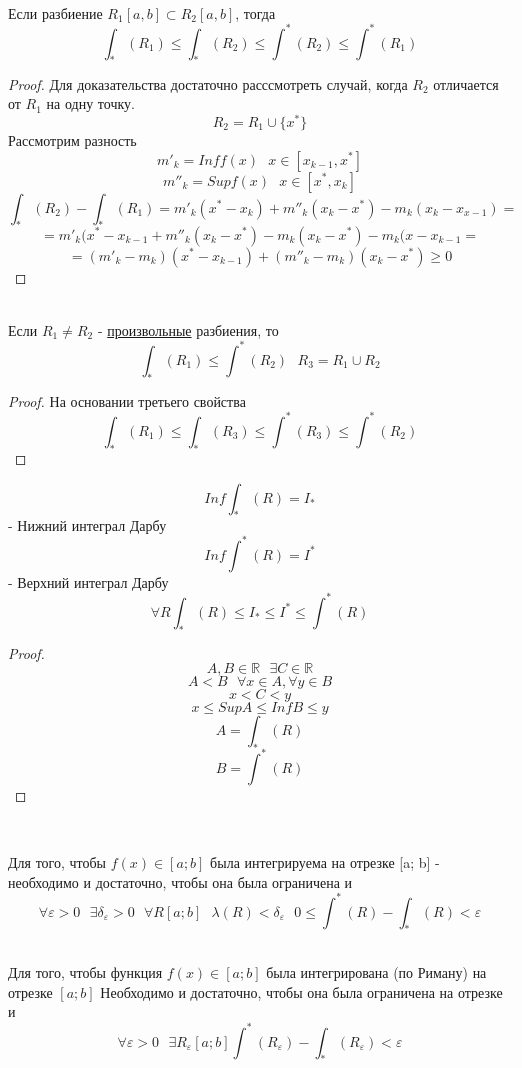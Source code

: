 \\
Если разбиение $R_1 [a,b] \subset R_2 [a,b]$, тогда
\[\int_* (R_1) \le \int_* (R_2) \le \int^* (R_2) \le \int^* (R_1)\]

\begin{proof}
  Для доказательства достаточно расссмотреть случай, когда $R_2$ отличается от
  $R_1$ на одну точку.
  \[R_2 = R_1 \cup \{x^*\}\]
  Рассмотрим разность
  \[m'_k = Inf f(x) ~~~ x \in [x_{k - 1}, x^*]\]
  \[m''_k = Sup f(x) ~~~ x \in [x^*, x_k]\]
  \[\int_* (R_2) - \int_* (R_1) = m'_k (x^* - x_k) + m''_k (x_k - x^*) -
    m_k (x_k - x_{x - 1}) = \]
  \[= m'_k (x^* - x_{k - 1} + m''_k (x_k - x^*) - m_k (x_k - x^*) -
    m_k (x - x_{k - 1} =\]
  \[= (m'_k - m_k)(x^* - x_{k - 1}) + (m''_k - m_k)
    (x_k - x^*) \ge 0\]
\end{proof}

\\
Если $R_1 \ne R_2$ - \underline{произвольные} разбиения, то
\[\int_* (R_1) \le \int^* (R_2) ~~~ R_3 = R_1 \cup R_2\]

\begin{proof}
  На основании третьего свойства
  \[\int_* (R_1) \le \int_* (R_3) \le \int^* (R_3) \le \int^* (R_2)\]
\end{proof}

\[Inf \int_* (R) = I_*\] - Нижний интеграл Дарбу
\[Inf \int^* (R) = I^*\] - Верхний интеграл Дарбу
\[\forall R \int_* (R) \le I_* \le I^* \le \int^* (R)\]

\begin{proof}
  \[A, B \in \mathbb R ~~~ \exists C \in \mathbb R\]
  \[A < B ~~~ \forall x \in A, \forall y \in B\]
  \[x < C < y\]
  \[x \le Sup A \le Inf B \le y\]
  \[A = {\int_* (R)}\]
  \[B = {\int^* (R)}\]
\end{proof}

\\

\begin{theorem}
  Для того, чтобы $f(x) \in [a; b]$ была интегрируема на отрезке [a; b] -
  необходимо и достаточно, чтобы она была ограничена и
  \[\forall \varepsilon > 0 ~~~ \exists \delta_\varepsilon > 0 ~~~\forall R [a; b]
    ~~~ \lambda (R) < \delta_\varepsilon ~~~ 0 \le \int^* (R) - \int_* (R) <
    \varepsilon\]

  \\
  Для того, чтобы функция $f(x) \in [a; b]$ была интегрирована (по Риману)
  на отрезке $[a; b]$ Необходимо и достаточно, чтобы она была ограничена на
  отрезке и
  \[\forall \varepsilon > 0 ~~~ \exists R_\varepsilon [a; b] \int^*
    (R_\varepsilon) - \int_* (R_\varepsilon) < \varepsilon\]
\end{theorem}

